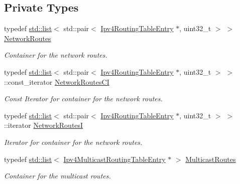 \subsection*{Private Types}
\begin{DoxyCompactItemize}
\item 
typedef \hyperlink{openflow-interface_8h_afd9bcfa176617760671b67580f536fa7}{std\+::list}$<$ std\+::pair$<$ \hyperlink{classns3_1_1Ipv4RoutingTableEntry}{Ipv4\+Routing\+Table\+Entry} $\ast$, uint32\+\_\+t $>$ $>$ \hyperlink{classns3_1_1Ipv4StaticRouting_ac3eb49f971bae7619f69b21dffb93078}{Network\+Routes}
\begin{DoxyCompactList}\small\item\em Container for the network routes. \end{DoxyCompactList}\item 
typedef \hyperlink{openflow-interface_8h_afd9bcfa176617760671b67580f536fa7}{std\+::list}$<$ std\+::pair$<$ \hyperlink{classns3_1_1Ipv4RoutingTableEntry}{Ipv4\+Routing\+Table\+Entry} $\ast$, uint32\+\_\+t $>$ $>$\+::const\+\_\+iterator \hyperlink{classns3_1_1Ipv4StaticRouting_ab8f7a067b65c827dd5012d9a99d79d1e}{Network\+Routes\+CI}
\begin{DoxyCompactList}\small\item\em Const Iterator for container for the network routes. \end{DoxyCompactList}\item 
typedef \hyperlink{openflow-interface_8h_afd9bcfa176617760671b67580f536fa7}{std\+::list}$<$ std\+::pair$<$ \hyperlink{classns3_1_1Ipv4RoutingTableEntry}{Ipv4\+Routing\+Table\+Entry} $\ast$, uint32\+\_\+t $>$ $>$\+::iterator \hyperlink{classns3_1_1Ipv4StaticRouting_a3d4f303cbea2117f36f3dd2da3ac59c9}{Network\+RoutesI}
\begin{DoxyCompactList}\small\item\em Iterator for container for the network routes. \end{DoxyCompactList}\item 
typedef \hyperlink{openflow-interface_8h_afd9bcfa176617760671b67580f536fa7}{std\+::list}$<$ \hyperlink{classns3_1_1Ipv4MulticastRoutingTableEntry}{Ipv4\+Multicast\+Routing\+Table\+Entry} $\ast$ $>$ \hyperlink{classns3_1_1Ipv4StaticRouting_a8ed35ab38cf9627ef4f80b06d3ce6531}{Multicast\+Routes}
\begin{DoxyCompactList}\small\item\em Container for the multicast routes. \end{DoxyCompactList}\item 

\end{DoxyCompactItemize}
